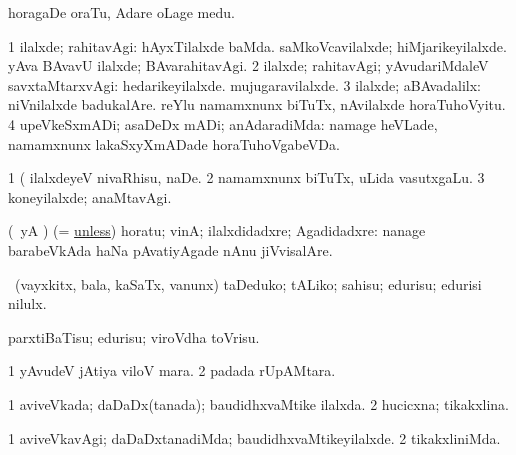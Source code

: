 \noindent
\gl{\pagu}
\expl{}
\bmng
{} horagaDe oraTu, Adare oLage medu. 
\emng
\eentry

\bentry
{} 
\gl{\upa}
\expl{}
\bmng
\bnum
\num{1} ilalxde; rahitavAgi:  hAyxTilalxde baMda.  saMkoVcavilalxde; hiMjarikeyilalxde.  yAva BAvavU ilalxde; BAvarahitavAgi. 
\num{2} ilalxde; rahitavAgi; yAvudariMdaleV savxtaMtarxvAgi:  hedarikeyilalxde.  mujugaravilalxde. 
\num{3} ilalxde; aBAvadalilx:  niVnilalxde badukalAre.  reYlu namamxnunx biTuTx, nAvilalxde horaTuhoVyitu. 
\num{4} upeVkeSxmADi; asaDeDx mADi; anAdaradiMda:  namage heVLade, namamxnunx lakaSxyXmADade horaTuhoVgabeVDa. 
\enum
\emng

\noindent
\gl{\pagu}
\expl{}
\bmng
\bnum
\num{1}  (  ilalxdeyeV nivaRhisu, naDe. 
\num{2}  namamxnunx biTuTx, uLida vasutxgaLu. 
\num{3}  koneyilalxde; anaMtavAgi. 
\enum
\emng
\eentry

\bentry
{} 
\gl{\saMavayx}
\expl{}
\bmng
(\pArxparx\ yA \asaM) (= \hyperref{kandict_u.pdf}{U}{unless}{unless}) horatu; vinA; ilalxdidadxre; Agadidadxre:  nanage barabeVkAda haNa pAvatiyAgade nAnu jiVvisalAre. 
\emng
\eentry

\bentry
{} 
\gl{\kirx}
\bmng
 \sakirx\ (vayxkitx, bala, kaSaTx, \mo vanunx) taDeduko; tALiko; sahisu; edurisu; edurisi nilulx. 
\emng

\noindent
\gl{\akirx}
\expl{}
\bmng
parxtiBaTisu; edurisu; viroVdha toVrisu. 
\emng
\eentry

\bentry
{} 
\gl{\nA}
\bmng
\bnum
\num{1} yAvudeV jAtiya viloV mara. 
\num{2}  padada rUpAMtara. 
\enum
\emng
\eentry

\bentry
{} 
\gl{\gu}
\expl{}
\bmng
\bnum
\num{1} aviveVkada; daDaDx(tanada); baudidhxvaMtike ilalxda. 
\num{2} hucicxna; tikakxlina. 
\enum
\emng
\eentry

\bentry
{} 
\gl{\kirxvi}
\expl{}
\bmng
\bnum
\num{1} aviveVkavAgi; daDaDxtanadiMda; baudidhxvaMtikeyilalxde. 
\num{2} tikakxliniMda. 
\enum
\emng
\eentry

